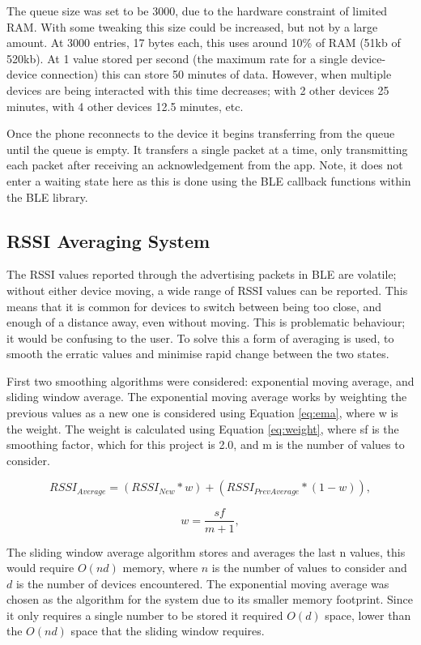 \documentclass{l4proj}
\begin{document}
The queue size was set to be 3000, due to the hardware constraint of limited RAM. With some tweaking this size could be increased, but not by a large amount. At 3000 entries, 17 bytes each, this uses around 10\% of RAM (51kb of 520kb). At 1 value stored per second (the maximum rate for a single device-device connection) this can store 50 minutes of data. However, when multiple devices are being interacted with this time decreases; with 2 other devices 25 minutes, with 4 other devices 12.5 minutes, etc.

Once the phone reconnects to the device it begins transferring from the queue until the queue is empty. It transfers a single packet at a time, only transmitting each packet after receiving an acknowledgement from the app. Note, it does not enter a waiting state here as this is done using the BLE callback functions within the BLE library.

\subsection{RSSI Averaging System}

The RSSI values reported through the advertising packets in BLE are volatile; without either device moving, a wide range of RSSI values can be reported. This means that it is common for devices to switch between being too close, and enough of a distance away, even without moving. This is problematic behaviour; it would be confusing to the user. To solve this a form of averaging is used, to smooth the erratic values and minimise rapid change between the two states.

First two smoothing algorithms were considered: exponential moving average, and sliding window average. The exponential moving average works by weighting the previous values as a new one is considered using Equation \ref{eq:ema}, where w is the weight. The weight is calculated using Equation \ref{eq:weight}, where sf is the smoothing factor, which for this project is 2.0, and m is the number of values to consider.

\begin{equation}
    {RSSI}_{Average}={({RSSI}_{New} * w)} + {({RSSI}_{PrevAverage} * (1 - w))},
    \label{eq:ema}
\end{equation}

\begin{equation}
    w=\frac{sf}{m + 1},
    \label{eq:weight}
\end{equation}

The sliding window average algorithm stores and averages the last n values, this would require $O(nd)$ memory, where $n$ is the number of values to consider and $d$ is the number of devices encountered. The exponential moving average was chosen as the algorithm for the system due to its smaller memory footprint. Since it only requires a single number to be stored it required $O(d)$ space, lower than the $O(nd)$ space that the sliding window requires.
\end{document}
